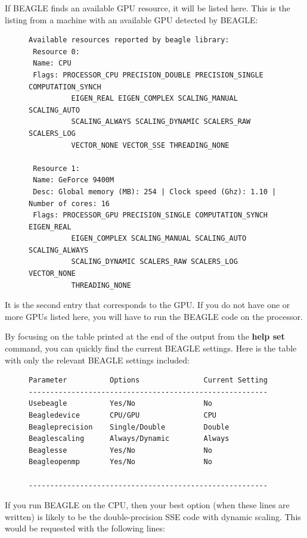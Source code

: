 \documentclass[12pt]{book}
\begin{document}
If BEAGLE finds an available GPU resource, it will be listed here. This is the listing from a
machine with an available GPU detected by BEAGLE:

\begin{figure}[h]
\centering
\begin{BVerbatim}
Available resources reported by beagle library:
 Resource 0:
 Name: CPU
 Flags: PROCESSOR_CPU PRECISION_DOUBLE PRECISION_SINGLE COMPUTATION_SYNCH
          EIGEN_REAL EIGEN_COMPLEX SCALING_MANUAL SCALING_AUTO
          SCALING_ALWAYS SCALING_DYNAMIC SCALERS_RAW SCALERS_LOG
          VECTOR_NONE VECTOR_SSE THREADING_NONE

 Resource 1:
 Name: GeForce 9400M
 Desc: Global memory (MB): 254 | Clock speed (Ghz): 1.10 | Number of cores: 16
 Flags: PROCESSOR_GPU PRECISION_SINGLE COMPUTATION_SYNCH EIGEN_REAL
          EIGEN_COMPLEX SCALING_MANUAL SCALING_AUTO SCALING_ALWAYS
          SCALING_DYNAMIC SCALERS_RAW SCALERS_LOG VECTOR_NONE
          THREADING_NONE
\end{BVerbatim}
\end{figure}

It is the second entry that corresponds to the GPU. If you do not have one or more GPUs listed
here, you will have to run the BEAGLE code on the processor.

By focusing on the table printed at the end of the output from the \textbf{help set} command, you
can quickly find the current BEAGLE settings. Here is the table with only the relevant BEAGLE
settings included:

\begin{figure}[h]
\centering
\begin{BVerbatim}
Parameter          Options               Current Setting
--------------------------------------------------------
Usebeagle          Yes/No                No             
Beagledevice       CPU/GPU               CPU            
Beagleprecision    Single/Double         Double         
Beaglescaling      Always/Dynamic        Always         
Beaglesse          Yes/No                No             
Beagleopenmp       Yes/No                No             
                                                        
--------------------------------------------------------
\end{BVerbatim}
\end{figure}

If you run BEAGLE on the CPU, then your best option (when these lines are written) is likely to be
the double-precision SSE code with dynamic scaling. This would be requested with the following
lines:
\end{document}
